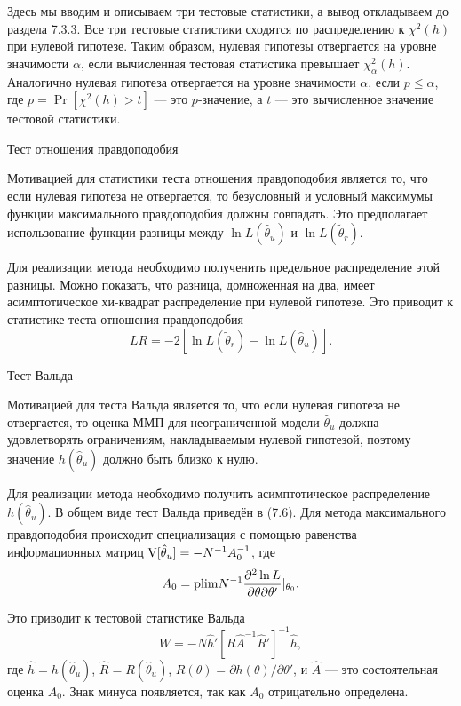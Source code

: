 Здесь мы вводим и описываем три тестовые статистики, а вывод откладываем до раздела 7.3.3. Все три тестовые статистики сходятся по распределению к $\chi^2(h)$ при нулевой гипотезе. Таким образом, нулевая гипотезы отвергается на уровне значимости $\alpha$, если вычисленная тестовая статистика превышает $\chi_{\alpha}^2(h)$. Аналогично нулевая гипотеза отвергается на уровне значимости $\alpha$, если $p \leq \alpha$, где $p = \Pr[\chi^2(h) > t]$ --- это $p$-значение, а $t$ --- это вычисленное значение тестовой статистики.

\begin{center}
Тест отношения правдоподобия
\end{center}

Мотивацией для статистики теста отношения правдоподобия является то, что если нулевая гипотеза не отвергается, то безусловный и условный максимумы функции максимального правдоподобия должны совпадать. Это предполагает использование функции разницы между $\ln L(\hat{\theta}_u)$ и $\ln L(\tilde{\theta}_r)$.

Для реализации метода необходимо полученить предельное распределение этой разницы. Можно показать, что разница, домноженная на два, имеет асимптотическое хи-квадрат распределение при нулевой гипотезе. Это приводит к статистике теста отношения правдоподобия
\begin{equation}
LR = -2[\ln L(\tilde{\theta}_r) - \ln L(\hat{\theta}_u)].
\end{equation}

\begin{center}
Тест Вальда
\end{center}

Мотивацией для теста Вальда является то, что если нулевая гипотеза не отвергается, то оценка ММП для неограниченной модели $\hat{\theta}_u$ должна удовлетворять ограничениям, накладываемым нулевой гипотезой, поэтому значение $h(\hat{\theta}_u)$ должно быть близко к нулю.

Для реализации метода необходимо получить асимптотическое распределение $h(\hat{\theta}_u)$. В общем виде тест Вальда приведён в (7.6). Для метода максимального правдоподобия происходит специализация с помощью равенства информационных матриц $\mathrm{V}[\hat{\theta}_u] = -N^{-1}A_0^{-1}$, где
\begin{equation}
A_0 = \mathrm{plim } N^{-1} \frac{\partial^2 \ln L}{\partial{\theta}\partial{\theta}'}|_{\theta_0}.
\end{equation}

Это приводит к тестовой статистике Вальда
\begin{equation}
W = -N\hat{h}'[\hat{R}\hat{A}^{-1}\hat{R}']^{-1}\hat{h},
\end{equation}
где $\hat{h} = h(\hat{\theta}_u)$, $\hat{R} = R(\hat{\theta}_u)$, $R(\theta) = \partial{h(\theta)}/\partial{\theta'}$, и $\hat{A}$ --- это состоятельная оценка $A_0$. Знак минуса появляется, так как $A_0$ отрицательно определена.

